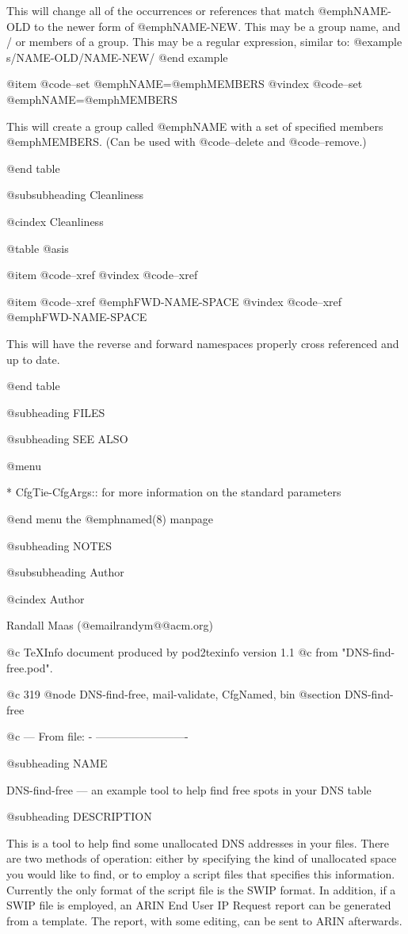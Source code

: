 This will change all of the occurrences or references that match @emph{NAME-OLD} to
the newer form of @emph{NAME-NEW}.  This may be a group name, and / or members of a
group.  This may be a regular expression, similar to:
@example
        s/NAME-OLD/NAME-NEW/
@end example

@item @code{--set} @emph{NAME}=@emph{MEMBERS}
@vindex @code{--set} @emph{NAME}=@emph{MEMBERS}

This will create a group called @emph{NAME} with a set of specified members
@emph{MEMBERS}.
(Can be used with @code{--delete} and  @code{--remove}.)

@end table

@subsubheading Cleanliness

@cindex Cleanliness

@table @asis

@item @code{--xref}
@vindex @code{--xref}

@item @code{--xref }@emph{FWD-NAME-SPACE}
@vindex @code{--xref }@emph{FWD-NAME-SPACE}

This will have the reverse and forward namespaces properly cross referenced and
up to date.

@end table

@subheading FILES

@subheading SEE ALSO


@menu

* CfgTie-CfgArgs::	
 for more information on the standard parameters

@end menu
the @emph{named}(8) manpage

@subheading NOTES

@subsubheading Author

@cindex Author

Randall Maas (@email{randym@@acm.org})

@c TeXInfo document produced by pod2texinfo version 1.1
@c from "DNS-find-free.pod".


@c 319
@node DNS-find-free, mail-validate, CfgNamed, bin
@section DNS-find-free


@c --- From file: - -------------------------

@subheading NAME


DNS-find-free --- an example tool to help find free spots in your DNS table

@subheading DESCRIPTION

This is a tool to help find some unallocated DNS addresses in your files.
There are two methods of operation: either by specifying the kind of
unallocated space you would like to find, or to employ a script files that
specifies this information.  Currently the only format of the script file is
the SWIP format.  In addition, if a SWIP file is employed, an ARIN End User IP
Request report can be generated from a template.  The report, with some
editing, can be sent to ARIN afterwards.

